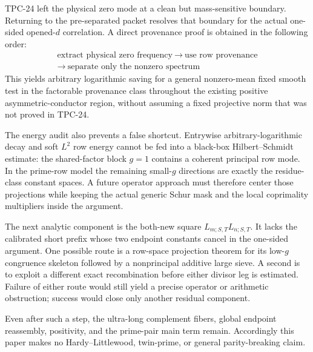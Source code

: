 TPC-24 left the physical zero mode at a clean but mass-sensitive
boundary.  Returning to the pre-separated packet resolves that boundary
for the actual one-sided opened-\(d\) correlation.  A direct
provenance proof is obtained in the following order:
\begin{equation}
 \boxed{
 \begin{gathered}
 \text{extract physical zero frequency}
 \ \longrightarrow\ \text{use row provenance}\\
 \longrightarrow\ \text{separate only the nonzero spectrum}
 \end{gathered}}
 \label{eq:tpc25-order-of-operations}
\end{equation}
This yields arbitrary logarithmic saving for a general nonzero-mean
fixed smooth test in the factorable provenance class throughout the
existing positive asymmetric-conductor region,
without assuming a fixed projective norm that was not proved in
TPC-24.

The energy audit also prevents a false shortcut.  Entrywise
arbitrary-logarithmic decay and soft \(L^2\) row energy cannot be fed
into a black-box Hilbert--Schmidt estimate: the shared-factor block
\(g=1\) contains a coherent principal row mode.  In the prime-row
model the remaining small-\(g\) directions are exactly the
residue-class constant spaces.  A future operator approach must
therefore center those projections while keeping the actual generic
Schur mask and the local coprimality multipliers inside the argument.

The next analytic component is the both-new square
\(L_{m;S,T}L_{n;S,T}\).  It lacks the calibrated short prefix whose two
endpoint constants cancel in the one-sided argument.  One possible
route is a row-space projection theorem for its low-\(g\) congruence
skeleton followed by a nonprincipal additive large sieve.  A second is
to exploit a different exact recombination before either divisor leg is
estimated.  Failure of either route would still yield a precise
operator or arithmetic obstruction; success would close only another
residual component.

Even after such a step, the ultra-long complement fibers, global
endpoint reassembly, positivity, and the prime-pair main term remain.
Accordingly this paper makes no Hardy--Littlewood, twin-prime, or
general parity-breaking claim.

